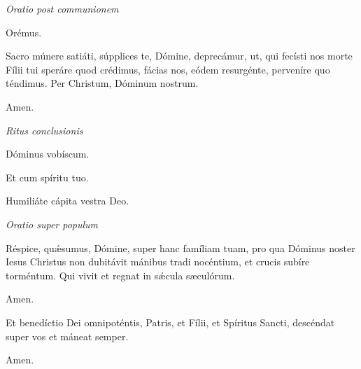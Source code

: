 \textit{Oratio post communionem}

Orémus.

Sacro múnere satiáti, súpplices te, Dómine, deprecámur, ut, qui fecísti nos morte Fílii tui speráre quod crédimus, fácias nos, eódem resurgénte, perveníre quo téndimus. Per Christum, Dóminum nostrum.

\Rbardot{} Amen.

\textit{Ritus conclusionis}

\Vbardot{} Dóminus vobíscum.

\Rbardot{} Et cum spíritu tuo.

\Vbardot{} Humiliáte cápita vestra Deo.

\textit{Oratio super populum}

Réspice, quǽsumus, Dómine, super hanc famíliam tuam, pro qua Dóminus noster Iesus Christus non dubitávit mánibus tradi nocéntium, et crucis subíre torméntum. Qui vivit et regnat in sǽcula sæculórum.

\Rbardot{} Amen.

Et benedíctio Dei omnipoténtis, Patris, et Fílii, \grecross{} et Spíritus Sancti, descéndat super vos et máneat semper.

\Rbardot{} Amen.
